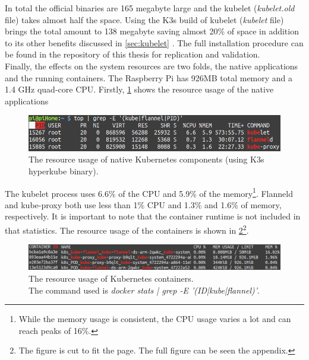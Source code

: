 In total the official binaries are 165 megabyte large and the kubelet (\textit{kubelet.old} file) takes almost half the space. Using the K3s build of kubelet (\textit{kubelet} file) brings the total amount to 138 megabyte saving almost 20\% of space in addition to its other benefits discussed in \cref{sec:kubelet} . The full installation procedure can be found in the repository of this thesis for replication and validation.\\
Finally, the effects on the system resources are two folds, the native applications and the running containers. The Raspberry Pi has 926MB total memory and a 1.4 GHz quad-core CPU. Firstly, \cref{fig:kubernetesResourceConsumption} shows the resource usage of the native applications
\begin{figure}[h!]
    \centering
    \includegraphics[scale=0.5]{figures/kubernetesResourceConsumption.png}
    \vspace*{-0.3cm}
    \caption{ The resource usage of native Kubernetes components (using K3s hyperkube binary).}
    \label{fig:kubernetesResourceConsumption}
\end{figure}
The kubelet process uses 6.6\% of the CPU and 5.9\% of the memory\footnote{While the memory usage is consistent, the CPU usage varies a lot and can reach peaks of 16\%.}. Flanneld and kube-proxy both use less than 1\% CPU and 1.3\% and 1.6\% of memory, respectively. It is important to note that the container runtime is not included in that statistics. The resource usage of the containers is shown in \cref{fig:kubernetesResourceConsumptionCut}\footnote{The figure is cut to fit the page. The full figure can be seen the appendix.}.
\begin{figure}[h!]
    \centering
    \includegraphics[scale=1.6]{figures/kubeContainerResourceUsageCut.png}
    \vspace*{-0.3cm}
    \caption{ The resource usage of Kubernetes containers.\\ The command used is \textit{docker stats | grep -E '(ID|kube|flannel)'}.}
    \label{fig:kubernetesResourceConsumptionCut}
\end{figure}
